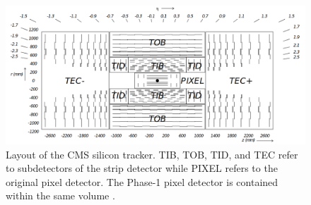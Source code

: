 \begin{figure}
\centering
\includegraphics[width=\textwidth]{figures/lhc_and_cms/tracker_layout.png}
\caption{Layout of the CMS silicon tracker. TIB, TOB, TID, and TEC refer to subdetectors of the strip detector while PIXEL refers to the original pixel detector. The Phase-1 pixel detector is contained within the same volume \cite{cms_experiment}.}
\label{tracker_layout}
\end{figure}
